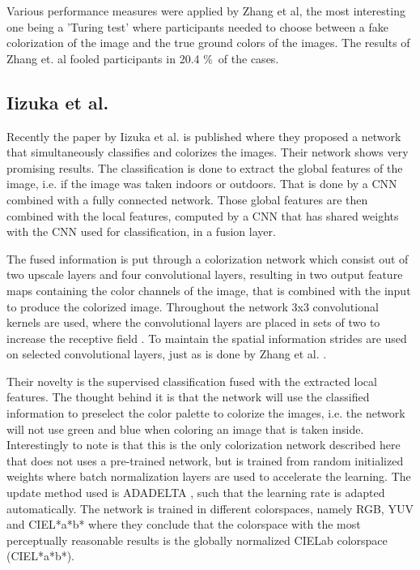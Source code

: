 Various performance measures were applied by Zhang et al, the most interesting one being a 'Turing test' where participants needed to choose between a fake colorization of the image and the true ground colors of the images. The results of Zhang et. al fooled participants in 20.4 \%\ of the cases. 



\subsection{Iizuka et al.}
Recently the paper by Iizuka et al. \cite{IizukaSIGGRAPH2016} is published where they proposed a network that simultaneously classifies and colorizes the images. Their network shows very promising results. The classification is done to extract the global features of the image, i.e. if the image was taken indoors or outdoors. That is done by a CNN combined with a fully connected network. Those global features are then combined with the local features, computed by a CNN that has shared weights with the CNN used for classification, in a fusion layer.

The fused information is put through a colorization network which consist out of two upscale layers and four convolutional layers, resulting in two output feature maps containing the color channels of the image, that is combined with the input to produce the colorized image. 
Throughout the network 3x3 convolutional kernels are used, where the convolutional layers are placed in sets of two to increase the receptive field \cite{Simonyan}. To maintain the spatial information strides are used  on selected convolutional layers, just as is done by Zhang et al. \cite{Zhang}.

Their novelty is the supervised classification fused with the extracted local features. The thought behind it is that the network will use the classified information to preselect the color palette to colorize the images, i.e. the network will not use green and blue when coloring an image that is taken inside.
Interestingly to note is that this is the only colorization network described here that does not uses a pre-trained network, but is trained from random initialized weights where batch normalization layers are used to accelerate the learning. The update method used is ADADELTA \cite{zeiler2012adadelta}, such that the learning rate is adapted automatically. 
The network is trained in different colorspaces, namely RGB, YUV and CIEL*a*b* where they conclude that the colorspace with the most perceptually reasonable results is the globally normalized CIELab colorspace (CIEL*a*b*).

